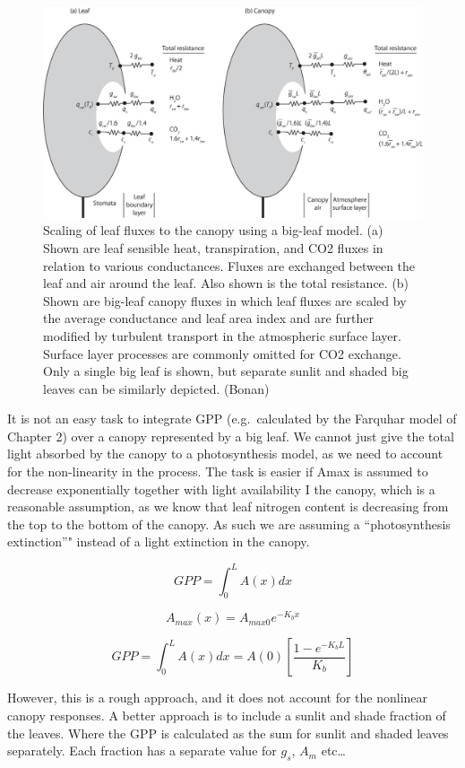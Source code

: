 \documentclass[
  12pt,
  oneside]{book}
\begin{document}
\begin{figure}

{\centering \includegraphics[width=0.8\linewidth]{figures/chap3/f323_bigleaf} 

}

\caption{Scaling of leaf fluxes to the canopy using a big-leaf model. (a) Shown are leaf sensible heat, transpiration, and CO2 fluxes in relation to various conductances. Fluxes are exchanged between the leaf and air around the leaf. Also shown is the total resistance. (b) Shown are big-leaf canopy fluxes in which leaf fluxes are scaled by the average conductance and leaf area index and are further modified by turbulent transport in the atmospheric surface layer. Surface layer processes are commonly omitted for CO2 exchange. Only a single big leaf is shown, but separate sunlit and shaded big leaves can be similarly depicted. (Bonan)}\label{fig:f323}
\end{figure}

It is not an easy task to integrate GPP (e.g.~calculated by the Farquhar model of Chapter 2) over a canopy represented by a big leaf. We cannot just give the total light absorbed by the canopy to a photosynthesis model, as we need to account for the non-linearity in the process. The task is easier if Amax is assumed to decrease exponentially together with light availability I the canopy, which is a reasonable assumption, as we know that leaf nitrogen content is decreasing from the top to the bottom of the canopy. As such we are assuming a ``photosynthesis extinction''" instead of a light extinction in the canopy.

\[
GPP = \int_0^LA(x)dx
\]

\[
A_{max}(x) = A_{max0}e^{-K_bx}
\]

\[
GPP = \int_0^{L}A(x)dx = A(0) \left[\frac{1 - e^{-K_b L}}{K_b} \right]
\]

However, this is a rough approach, and it does not account for the nonlinear canopy responses. A better approach is to include a sunlit and shade fraction of the leaves. Where the GPP is calculated as the sum for sunlit and shaded leaves separately. Each fraction has a separate value for \(g_s\), \(A_m\) etc\ldots{}
\end{document}

